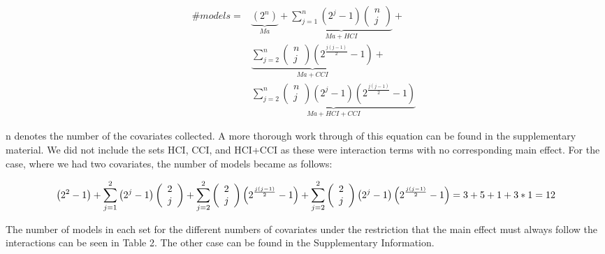 \begin{equation} 
\begin{aligned}
\#models={} & \underbrace{\left(2^n\right)}_{Ma}+\underbrace{\sum^n_{j=1}{\left(2^j-1\right)\left( \begin{array}{c}
n \\ 
j \end{array}
\right)}}_{Ma+HCI} + \\ 
& \underbrace{\sum^n_{j=2}{\left( \begin{array}{c}
n \\ 
j \end{array}
\right)\left(2^{\frac{j\left(j-1\right)}{2}}-1\right)}}_{Ma+CCI} + \\
& \underbrace{\sum^n_{j=2}{\left( \begin{array}{c}
n \\ 
j \end{array}
\right)\left(2^j-1\right)\left(2^{\frac{j\left(j-1\right)}{2}}-1\right)}}_{Ma+HCI+CCI}\ \  
\end{aligned}
\end{equation} 

n denotes the number of the covariates collected. A more thorough work through of this equation can be found in the supplementary material.
We did not include the sets HCI, CCI, and HCI+CCI as these were interaction terms with no corresponding main effect. For the case, where we had two covariates, the number of models became as follows: \\


\begin{aligned}
\centering
\[\left(2^2-1\right)+
\sum^2_{j=1}{\left(2^j-1\right)\left( \begin{array}{c}
2 \\ 
j \end{array}
\right)}+
\sum^2_{j=2}{\left( \begin{array}{c}
2 \\ 
j \end{array}
\right)\left(2^{\frac{j\left(j-1\right)}{2}}-1\right)} +  
 \sum^2_{j=2}{\left( \begin{array}{c}
2 \\ 
j \end{array}
\right)\left(2^j-1\right)\left(2^{\frac{j\left(j-1\right)}{2}}-1\right)}= \\
 3+5+1+3*1=12\] 
\end{aligned}


The number of models in each set for the different numbers of covariates under the restriction that the main effect must always follow the interactions can be seen in Table 2. The other case can be found in the Supplementary Information. \\

